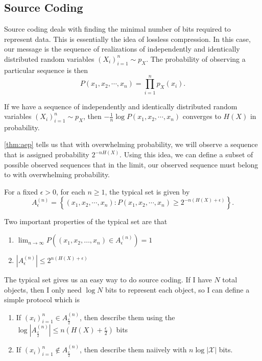\subsection{Source Coding}
Source coding deals with finding the minimal number of bits required to represent data.
This is essentially the idea of lossless compression.
In this case, our message is the sequence of realizations of independently and identically distributed random variables $\left(X_i\right)_{i=1}^n \sim p_X$.
The probability of observing a particular sequence is then \[
	P(x_1, x_2, \cdots, x_n) = \prod_{i=1}^np_X(x_i).
\]
\begin{theorem}
	If we have a sequence of independently and identically distributed random variables $\left(X_i\right)_{i=1}^n \sim p_X$, then $-\frac{1}{n}\log P(x_1, x_2, \cdots, x_n)$ converges to $H(X)$ in probability.
	\label{thm:aep}
\end{theorem}
\cref{thm:aep} tells us that with overwhelming probability, we will observe a sequence that is assigned probability $2^{-nH(X)}$.
Using this idea, we can define a subset of possible observed sequences that in the limit, our observed sequence must belong to with overwhelming probability.
\begin{definition}
	For a fixed $\epsilon > 0$, for each $n\geq 1$, the typical set is given by \[
		A_\epsilon^{(n)} = \left\{ (x_1, x_2, \cdots, x_n) : P(x_1, x_2, \cdots, x_n) \geq 2^{-n(H(X)+\epsilon)} \right\}.
	\]
	\label{defn:typical-set}
\end{definition}
Two important properties of the typical set are that
\begin{enumerate}
	\item $\lim_{n\to\infty}P\left((x_1, x_2, \ldots, x_n) \in A_{\epsilon}^{(n)}\right) = 1$
	\item $|A_{\epsilon}^{(n)}| \leq 2^{n(H(X)+\epsilon)}$
\end{enumerate}
The typical set gives us an easy way to do source coding.
If I have $N$ total objects, then I only need $\log N$ bits to represent each object, so I can define a simple protocol which is
\begin{enumerate}
	\item If $(x_i)_{i=1}^{n} \in A^{(n)}_{\frac{\epsilon}{2}}$, then describe them using the $\log|A^{(n)}_{\frac{\epsilon}{2}}| \leq n\left(H(X)+\frac{\epsilon}{2}\right)$ bits
	\item If $(x_i)_{i=1}^n \not \in A^{(n)}_{\frac{\epsilon}{2}}$, then describe them naiively with $n\log|\mathcal{X}|$ bits.
\end{enumerate}
